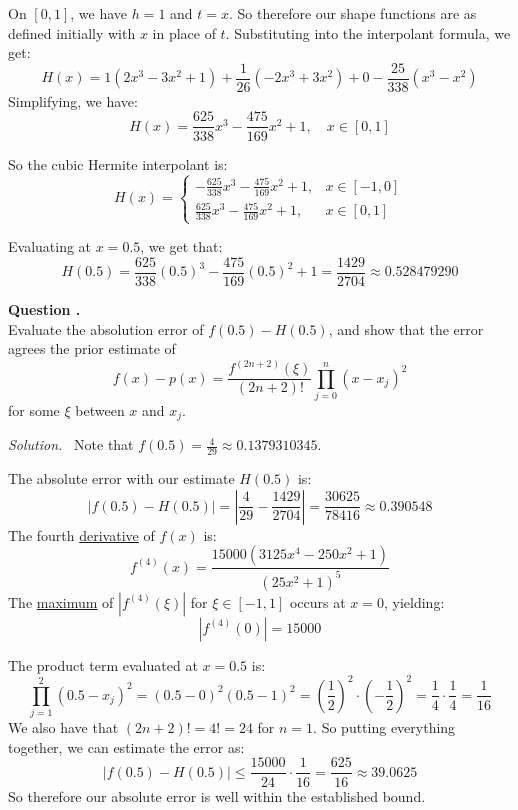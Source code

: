 \documentclass[12pt]{article}
\newcounter{question}
\newcounter{subquest}
\newcommand{\subquestion}[1][true]{
    \stepcounter{subquest} 
    \ifthenelse{\equal{#1}{true} \and \value{subquest}>1}{\newpage}{}
    \vspace{1em}
    \textbf{\large Question \thequestion.\thesubquest}
    \vspace{.5em}\ \\}
\newcommand{\solution}
    {\par\vspace{0.5em}\noindent\emph{Solution.}\ }
    {\par\vspace{1em}}
\begin{document}
On $[0,1]$, we have $h=1$ and $t=x$. So therefore our shape functions are as defined initially with $x$ in place of $t$.
Substituting into the interpolant formula, we get:
\[H(x) = 1(2x^3 - 3x^2 + 1) + \frac{1}{26}(-2x^3 + 3x^2) + 0 -\frac{25}{338}(x^3 - x^2)\]
Simplifying, we have:
\[H(x) = \frac{625}{338}x^3 - \frac{475}{169}x^2 + 1, \quad x\in[0,1]\]

So the cubic Hermite interpolant is:
\[H(x) = \begin{cases} -\frac{625}{338}x^3 - \frac{475}{169}x^2 + 1, & x\in[-1,0] \\[6pt] \frac{625}{338}x^3 - \frac{475}{169}x^2 + 1, & x\in[0,1] \end{cases}\]

Evaluating at $x=0.5$, we get that:
\[H(0.5) = \frac{625}{338}(0.5)^3 - \frac{475}{169}(0.5)^2 + 1 = \frac{1429}{2704} \approx 0.528479290\]

\subquestion
Evaluate the absolution error of $f(0.5)-H(0.5)$, and show that the error agrees the prior estimate of 
\[f(x)-p(x)=\frac{f^{(2n+2)}(\xi)}{(2n+2)!}\prod_{j=0}^{n}(x-x_j)^2\]
for some $\xi$ between $x$ and $x_j$.

\solution
Note that $f(0.5) = \frac{4}{29} \approx 0.1379310345$. 

The absolute error with our estimate $H(0.5)$ is:
\[|f(0.5)-H(0.5)| = \left|\frac{4}{29} - \frac{1429}{2704}\right| = \frac{30625}{78416} \approx 0.390548\]
The fourth \href{https://www.derivative-calculator.net/}{derivative} of $f(x)$ is:
\[f^{(4)}(x) = \frac{15000 \left(3125x^{4} - 250x^{2} + 1\right)}{\left(25x^{2} + 1\right)^{5}}\]
The \href{https://www.wolframalpha.com/input?i=maximum+calculator&assumption=%7B%22F%22%2C+%22GlobalMaximizeCalculator%22%2C+%22curvefunction%22%7D+-%3E%22abs%2815000%283125x%5E4-250x%5E2%2B1%29%2F%28%2825x%5E2%2B1%29%5E5%29%29%22&assumption=%7B%22F%22%2C+%22GlobalMaximizeCalculator%22%2C+%22domain%22%7D+-%3E%22-1+%3C%3D+x+%3C%3D+1%22}{maximum} of $|f^{(4)}(\xi)|$ for $\xi \in [-1,1]$ occurs at $x=0$, yielding:
\[|f^{(4)}(0)| = 15000\]

The product term evaluated at $x=0.5$ is:
\[\prod_{j=1}^{2}(0.5 - x_j)^2 = (0.5 - 0)^2 (0.5 - 1)^2 = \left(\frac{1}{2}\right)^2 \cdot \left(-\frac{1}{2}\right)^2 = \frac{1}{4} \cdot \frac{1}{4} = \frac{1}{16}\]
We also have that $(2n+2)! = 4! = 24$ for $n=1$.
So putting everything together, we can estimate the error as:
\[\left|f(0.5)-H(0.5)\right| \leq \frac{15000}{24} \cdot \frac{1}{16} = \frac{625}{16} \approx 39.0625\]
So therefore our absolute error is well within the established bound.
\end{document}
